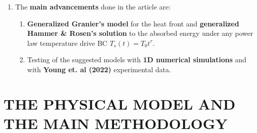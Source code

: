 \documentclass[11pt]{article}
\begin{document}
\begin{enumerate}
\begin{enumerate}
    \item \uline{Hammer \& Rosen (2003)} - solved \textbf{supersonic} for a general temperature drive BC $T_s(t)$, not just the specific $\tau$s above.
    \item \uline{Krief (2023)} - extended Shussman \& Heizler (2015) to inhomogeneous initial densities ($\rho = \rho_0 x^{-\omega}$).
    \item \uline{Granier (1981)} - used self-similar solution when the heat front is equal to the sound speed, which happens at the "critical exponent" $\tau_c = \frac{1}{4+\alpha-2\beta}$.
    \item \uline{Young et. al (2022)} - experimental data for the transition region between supersonic and subsonic flow, which happens \textbf{while the laser is on} to enable the modelling of the power-law temperature drive.
  \end{enumerate}
  \item The \textbf{main advancements} done in the article are:
  \begin{enumerate}
    \item \textbf{Generalized Granier's model} for the heat front and \textbf{generalized Hammer \& Rosen's solution} to the absorbed energy under any power law temperature drive BC $T_s(t) = T_0 t^\tau$.
    \item Testing of the suggested models with \textbf{1D numerical simulations} and with \textbf{Young et. al (2022)} experimental data.
  \end{enumerate}
\end{enumerate}

\section{THE PHYSICAL MODEL AND THE MAIN
METHODOLOGY}
\end{document}
